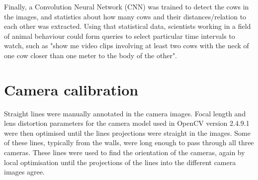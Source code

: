 \documentclass[10pt,a4paper,twocolumn]{article}
\begin{document}
Finally, a Convolution Neural Network (CNN)  was trained to detect the cows in the images, and statistics about how many cows and their distances/relation to each other was extracted. Using that statistical data, scientists working in a field of animal behaviour could form queries to select particular time intervals to watch, such as "show me video clips involving at least two cows with the neck of one cow closer than one meter to the body of the other".


\section{Camera calibration}

Straight lines were manually annotated in the camera images. Focal length and lens distortion parameters for the camera model used in OpenCV version 2.4.9.1 were then  optimised until the lines projections were straight in the images. Some of these lines, typically from the walls, were long enough to pass through all three cameras. These lines were used to find the orientation of the cameras, again by local optimisation until the projections of the lines into the different camera images agree.

%
%
%
\end{document}

